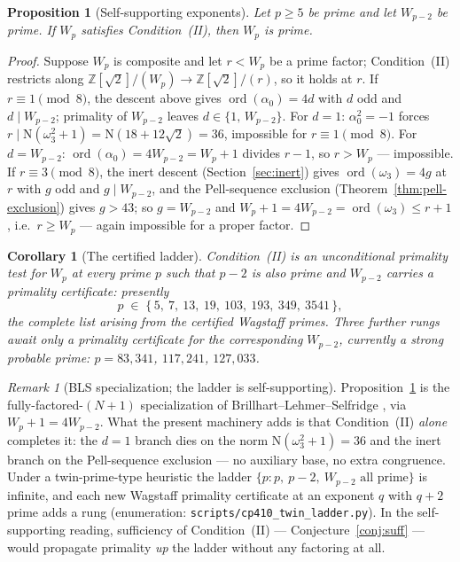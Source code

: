 \documentclass[11pt]{amsart}
\theoremstyle{plain}
\newtheorem{proposition}[theorem]{Proposition}
\newtheorem{corollary}[theorem]{Corollary}
\theoremstyle{definition}
\theoremstyle{remark}
\newtheorem{remark}[theorem]{Remark}
\numberwithin{equation}{section}
\newcommand{\ord}{\operatorname{ord}}
\newcommand{\Z}{\mathbb{Z}}
\begin{document}
\begin{proposition}[Self-supporting exponents]\label{prop:ladder}
Let $p \geq 5$ be prime and let $W_{p-2}$ be prime. If $W_p$ satisfies Condition~(II), then $W_p$ is prime.
\end{proposition}

\begin{proof}
Suppose $W_p$ is composite and let $r < W_p$ be a prime factor; Condition~(II) restricts along $\Z[\sqrt2]/(W_p) \to \Z[\sqrt2]/(r)$, so it holds at $r$. If $r \equiv 1 \pmod 8$, the descent above gives $\ord(\alpha_0) = 4d$ with $d$ odd and $d \mid W_{p-2}$; primality of $W_{p-2}$ leaves $d \in \{1,\, W_{p-2}\}$. For $d = 1$: $\alpha_0^2 = -1$ forces $r \mid \mathrm N(\omega_3^2 + 1) = \mathrm N(18 + 12\sqrt 2) = 36$, impossible for $r \equiv 1 \pmod 8$. For $d = W_{p-2}$: $\ord(\alpha_0) = 4 W_{p-2} = W_p + 1$ divides $r - 1$, so $r > W_p$ --- impossible. If $r \equiv 3 \pmod 8$, the inert descent (Section~\ref{sec:inert}) gives $\ord(\omega_3) = 4g$ at $r$ with $g$ odd and $g \mid W_{p-2}$, and the Pell-sequence exclusion (Theorem~\ref{thm:pell-exclusion}) gives $g > 43$; so $g = W_{p-2}$ and $W_p + 1 = 4 W_{p-2} = \ord(\omega_3) \leq r + 1$, i.e.\ $r \geq W_p$ --- again impossible for a proper factor.
\end{proof}

\begin{corollary}[The certified ladder]\label{cor:ladder}
Condition~(II) is an unconditional primality test for $W_p$ at every prime $p$ such that $p - 2$ is also prime and $W_{p-2}$ carries a primality certificate: presently
\[
  p \;\in\; \{\,5,\ 7,\ 13,\ 19,\ 103,\ 193,\ 349,\ 3541\,\},
\]
the complete list arising from the certified Wagstaff primes. Three further rungs await only a primality certificate for the corresponding $W_{p-2}$, currently a strong probable prime: $p = 83{,}341$, $117{,}241$, $127{,}033$.
\end{corollary}

\begin{remark}[BLS specialization; the ladder is self-supporting]\label{rem:ladder}
Proposition~\ref{prop:ladder} is the fully-factored-$(N+1)$ specialization of Brillhart--Lehmer--Selfridge \cite{ref:BLS}, via $W_p + 1 = 4 W_{p-2}$. What the present machinery adds is that Condition~(II) \emph{alone} completes it: the $d = 1$ branch dies on the norm $\mathrm N(\omega_3^2 + 1) = 36$ and the inert branch on the Pell-sequence exclusion --- no auxiliary base, no extra congruence. Under a twin-prime-type heuristic the ladder $\{p : p,\ p-2,\ W_{p-2} \text{ all prime}\}$ is infinite, and each new Wagstaff primality certificate at an exponent $q$ with $q + 2$ prime adds a rung (enumeration: \texttt{scripts/cp410\_twin\_ladder.py}). In the self-supporting reading, sufficiency of Condition~(II) --- Conjecture~\ref{conj:suff} --- would propagate primality \emph{up} the ladder without any factoring at all.
\end{remark}
\end{document}
